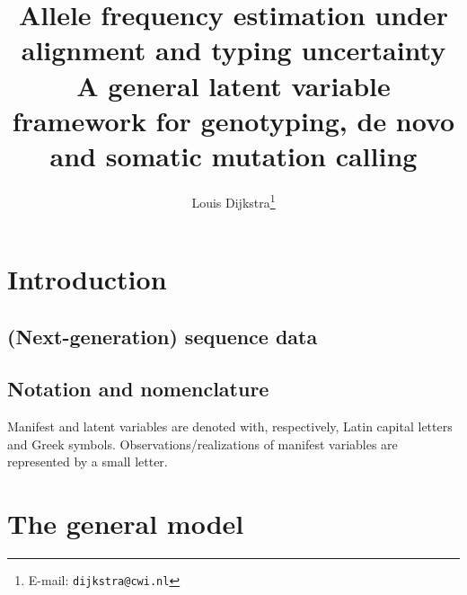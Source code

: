 \documentclass[12pt,a4paper]{article}
\numberwithin{equation}{section}
\begin{document}
\title{Allele frequency estimation under alignment and typing uncertainty \\ A general latent variable framework for genotyping, de novo and somatic mutation calling}
\author{Louis Dijkstra\footnote{E-mail: \texttt{dijkstra@cwi.nl}}}

\maketitle

\begin{abstract}
	 
\end{abstract}


\section{Introduction} \label{sec:introduction}


\subsection{(Next-generation) sequence data}




\subsection{Notation and nomenclature}

Manifest and latent variables are denoted with, respectively, Latin capital letters and Greek symbols. Observations/realizations of manifest variables are represented by a small letter. 

\section{The general model}
\end{document}
